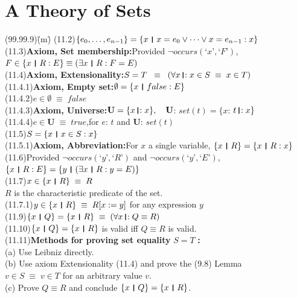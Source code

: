 \documentclass{amsart}
\newcommand{\lgap}{2pt}                             %
\newcommand{\equivs}{\ensuremath{\;\equiv\;}}       %
\newcommand{\equivss}{\ensuremath{\;\;\equiv\;\;}}  %
\newcommand{\thedr}{\rule[-.25ex]{.32mm}{1.75ex}}   %
\newcommand{\dr}{\;\,\thedr\,\;}                    %
\newcommand{\rb}{:}                                 %
\newcommand{\drrb}{\;\thedr\,{:}\;}                 %
\newcommand{\all}{\forall}                          %
\newcommand{\ext}{\exists}                          %
\newcommand{\Lq}{\mbox{`}}
\newcommand{\Rq}{\mbox{'}}
\begin{document}
\section*{A Theory of Sets}
\begin{tabbing}
(99.99.9)\;\=(m)\;\=\kill
(11.2)\>$\{e_{0},\ldots ,e_{n-1}\} = \{ x\dr x=e_{0}\lor \cdots \lor x=e_{n-1}\rb x \}$\\[\lgap]
(11.3)\>\textbf{Axiom, Set membership:}\quad Provided $\neg occurs(\Lq x\Rq ,\Lq F\Rq)$,\\[\lgap]
      \>$F\in \{x\dr R\rb E\}\equiv (\ext x\dr R\rb F=E)$\\[\lgap]
(11.4)\>\textbf{Axiom, Extensionality:}\quad $S=T\equivss (\all x\drrb x\in S\equivs x\in T)$\\[\lgap]
(11.4.1)\>\textbf{Axiom, Empty set:}\quad $\emptyset = \{x\dr false\rb E\}$\\
(11.4.2)\>$e\in \emptyset\equivs false$\\
(11.4.3)\>\textbf{Axiom, Universe:}\quad $\mathbf{U}=\{x\drrb x\},\quad \mathbf{U}$: $set(t) =\{x$: $t\drrb x\}$\\
(11.4.4)\>$e\in \mathbf{U}\equivs true$,\quad for $e$: $t$ and $\mathbf{U}$: $set(t)$\\
(11.5)\>$S=\{x\dr x\in S\rb x\}$\\[\lgap]
(11.5.1)\>\textbf{Axiom, Abbreviation:}\quad For $x$ a single variable, $\{x\dr R\} = \{x\dr R\rb x\}$\\
(11.6)\>Provided $\neg occurs(\Lq y\Rq ,\Lq R\Rq)$ and $\neg occurs(\Lq y\Rq ,\Lq E\Rq)$,\\[\lgap]
      \>$\{x\dr R\rb E\} = \{y\dr (\ext x\dr R\rb y=E)\}$\\[\lgap]
(11.7)\>$x\in \{x\dr R\} \equivs R$\\[\lgap]
      \>$R$ is the characteristic predicate of the set.\\[\lgap]
(11.7.1)\>$y\in \{x\dr R\} \equivs R[x:=y]$ for any expression $y$\\[\lgap]
(11.9)\>$\{x\dr Q\} = \{x\dr R\} \equivs (\all x\drrb Q\equiv R)$\\[\lgap]
(11.10)\>$\{x\dr Q\} = \{x\dr R\}$ is valid iff $Q\equiv R$ is valid.\\[\lgap]
(11.11)\>\textbf{Methods for proving set equality } $S=T$ \textbf{:}\\[\lgap]
       \> (a)\> Use Leibniz directly.\\[\lgap]
       \> (b)\> Use axiom Extensionality (11.4) and prove the (9.8) Lemma\\
       \>    \> $v\in S\equivs v\in T$ for an arbitrary value $v$.\\[\lgap]
       \> (c)\> Prove $Q\equiv R$ and conclude $\{x\dr Q\} = \{x\dr R\}$.\\[\lgap]
\end{tabbing}
\end{document}
